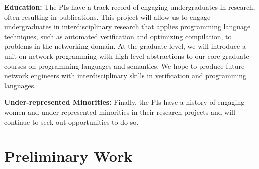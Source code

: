 \noindent
{\bf Education:} 
The PIs have a track record of engaging undergraduates in research, often resulting in publications.  This project will allow us to engage undergraduates in interdisciplinary
research that applies programming language techniques, such as
automated verification and optimizing compilation, to problems in the networking domain.  At the graduate
level, we will introduce a unit on network programming with high-level
abstractions to our core
graduate courses on programming languages and semantics.  
We hope to
produce future network engineers with interdisciplinary skills in verification
and programming languages.

\noindent
{\bf Under-represented Minorities:} Finally, the PIs have a history of engaging women and under-represented minorities in
their research projects and will continue to seek out opportunities to
do so.  

\section{Preliminary Work}
\label{sec:propane}

